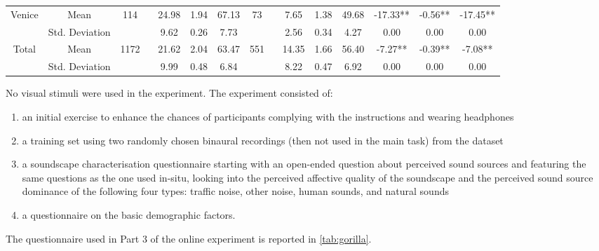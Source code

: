 \begin{table}
{\begin{tabular}{cc|cccc|cccc|ccc}
Venice & Mean & \multirow{2}{*}{114 ~} & 24.98 & 1.94 & 67.13 & \multirow{2}{*}{73 ~} & 7.65 & 1.38 & 49.68 & -17.33** & -0.56** & -17.45** \\
~ & Std.  Deviation &  & 9.62 & 0.26 & 7.73 &  & 2.56 & 0.34 & 4.27 & 0.00 & 0.00 & 0.00 \\ 
\hline
Total & Mean & \multirow{2}{*}{1172 ~} & 21.62 & 2.04 & 63.47 & \multirow{2}{*}{551 ~} & 14.35 & 1.66 & 56.40 & -7.27** & -0.39** & -7.08** \\
 & Std. Deviation &  & 9.99 & 0.48 & 6.84 &  & 8.22 & 0.47 & 6.92 & 0.00 & 0.00 & 0.00 \\
\bottomrule
\end{tabular}
}
\end{table}

   No visual stimuli were used in the experiment. The experiment consisted of:

   \begin{enumerate}
     \item an initial exercise to enhance the chances of participants complying with the instructions and wearing headphones
     \item a training set using two randomly chosen binaural recordings (then not used in the main task) from the dataset
     \item a soundscape characterisation questionnaire starting with an open-ended question about perceived sound sources and featuring the same questions as the one used in-situ, looking into the perceived affective quality of the soundscape and the perceived sound source dominance of the following four types: traffic noise, other noise, human sounds, and natural sounds
     \item a questionnaire on the basic demographic factors.
   \end{enumerate}

   The questionnaire used in Part 3 of the online experiment is reported in \cref{tab:gorilla}.

